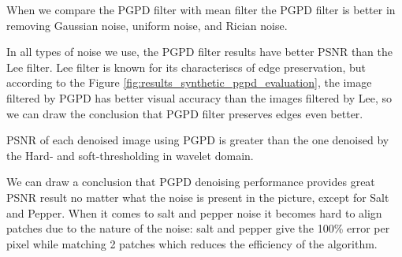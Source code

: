 When we compare the PGPD filter with mean filter the PGPD filter is better in removing Gaussian noise, uniform noise, and Rician noise. 

In all types of noise we use, the PGPD filter results have better PSNR than the Lee filter.  Lee filter is known for its characteriscs of edge preservation, but according to the Figure \ref{fig:results_synthetic_pgpd_evaluation}, the image filtered by PGPD has better visual accuracy than the images filtered by Lee, so we can draw the conclusion that PGPD filter preserves edges even better. 

PSNR of each denoised image using PGPD is greater than the one denoised by the Hard- and soft-thresholding in wavelet domain.

We can draw a conclusion that PGPD denoising performance provides great PSNR result no matter what the noise is present in the picture, except for Salt and Pepper. When it comes to salt and pepper noise it becomes hard to align patches due to the nature of the noise: salt and pepper give the 100\% error per pixel while matching 2 patches which reduces the efficiency of the algorithm.


